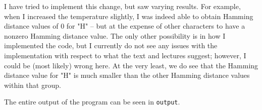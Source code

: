 \begin{qBox}{1}
\baseSkip

I have tried to implement this change, but saw varying results.
For example, when I increased the temperature slightly, I was indeed able to 
obtain Hamming distance values of \( 0 \) for "H" -- but at the expense of other 
characters to have a nonzero Hamming distance value.
The only other possibility is in how I implemented the code, but I currently do not see 
any issues with the implementation with respect to what the text and lectures suggest;
however, I could be (most likely) wrong here.
At the very least, we do see that the Hamming distance value for "H" is much smaller
than the other Hamming distance values within that group.

\baseSkip 

The entire output of the program can be seen in \texttt{output}.
\end{qBox}